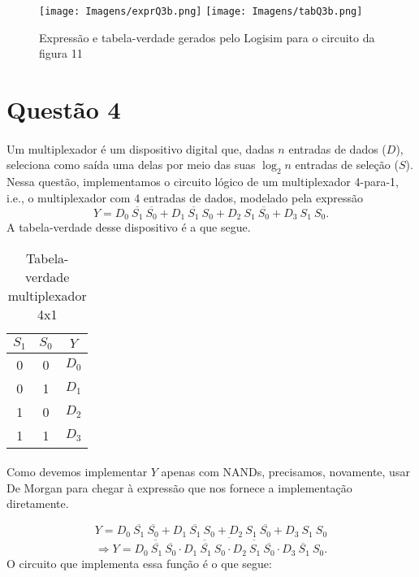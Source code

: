 \documentclass[a4paper, 12pt]{article}
\begin{document}
\begin{figure}[H]
    \centering
    \texttt{[image: Imagens/exprQ3b.png]}
    \texttt{[image: Imagens/tabQ3b.png]} \\
    \caption{Expressão e tabela-verdade gerados pelo Logisim para o circuito da figura 11}
\end{figure}

\section{Questão 4}
\paragraph{}
Um multiplexador é um dispositivo digital que, dadas $n$ entradas de dados ($D$), seleciona como saída uma delas por meio das suas $\log_2n$ entradas de seleção ($S$). Nessa questão, implementamos o circuito lógico de um multiplexador 4-para-1, i.e., o multiplexador com 4 entradas de dados, modelado pela expressão
\[
Y = D_0 \ \overline{S_1} \ \overline{S_0} + D_1 \ \overline{S_1} \ S_0 + D_2 \ S_1 \ \overline{S_0} + D_3 \ S_1 \ S_0.
\]
A tabela-verdade desse dispositivo é a que segue.

\begin{table}[H]
    \centering
    \begin{tabular}{|c|c|c|}
        \hline
        $S_1$ & $S_0$ & $Y$ \\ \hline
        0 & 0 & $D_0$ \\ \hline
        0 & 1 & $D_1$ \\ \hline
        1 & 0 & $D_2$ \\ \hline
        1 & 1 & $D_3$ \\ \hline
    \end{tabular}
    \caption{Tabela-verdade multiplexador 4x1}
\end{table}

\paragraph{}
Como devemos implementar $Y$ apenas com NANDs, precisamos, novamente, usar De Morgan para chegar à expressão que nos fornece a implementação diretamente.

\[
Y = D_0 \ \overline{S_1} \ \overline{S_0} + D_1 \ \overline{S_1} \ S_0 + D_2 \ S_1 \ \overline{S_0} + D_3 \ S_1 \ S_0
\]
\[
\Rightarrow Y = \overline{\overline{D_0 \ \overline{S_1} \ \overline{S_0}} \cdot \overline{D_1 \ \overline{S_1} \ S_0} \cdot \overline{D_2 \ S_1 \ \overline{S_0}} \cdot \overline{D_3 \ S_1 \ S_0}}.
\]
O circuito que implementa essa função é o que segue:
\end{document}
